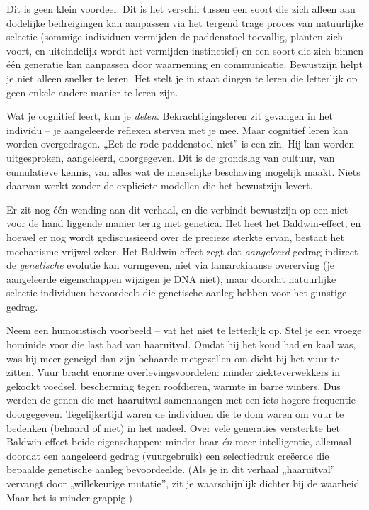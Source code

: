 \documentclass[11pt, twoside, openright]{book}
\begin{document}
Dit is geen klein voordeel. Dit is het verschil tussen een soort die zich alleen aan dodelijke bedreigingen kan aanpassen via het tergend trage proces van natuurlijke selectie (sommige individuen vermijden de paddenstoel toevallig, planten zich voort, en uiteindelijk wordt het vermijden instinctief) en een soort die zich binnen één generatie kan aanpassen door waarneming en communicatie. Bewustzijn helpt je niet alleen sneller te leren. Het stelt je in staat dingen te leren die letterlijk op geen enkele andere manier te leren zijn.

Wat je cognitief leert, kun je \textit{delen}. Bekrachtigingsleren zit gevangen in het individu -- je aangeleerde reflexen sterven met je mee. Maar cognitief leren kan worden overgedragen. „Eet de rode paddenstoel niet” is een zin. Hij kan worden uitgesproken, aangeleerd, doorgegeven. Dit is de grondslag van cultuur, van cumulatieve kennis, van alles wat de menselijke beschaving mogelijk maakt. Niets daarvan werkt zonder de expliciete modellen die het bewustzijn levert.

Er zit nog één wending aan dit verhaal, en die verbindt bewustzijn op een niet voor de hand liggende manier terug met genetica. Het heet het Baldwin-effect, en hoewel er nog wordt gediscussieerd over de precieze sterkte ervan, bestaat het mechanisme vrijwel zeker. Het Baldwin-effect zegt dat \textit{aangeleerd} gedrag indirect de \textit{genetische} evolutie kan vormgeven, niet via lamarckiaanse overerving (je aangeleerde eigenschappen wijzigen je DNA niet), maar doordat natuurlijke selectie individuen bevoordeelt die genetische aanleg hebben voor het gunstige gedrag.

Neem een humoristisch voorbeeld -- vat het niet te letterlijk op. Stel je een vroege hominide voor die last had van haaruitval. Omdat hij het koud had en kaal was, was hij meer geneigd dan zijn behaarde metgezellen om dicht bij het vuur te zitten. Vuur bracht enorme overlevingsvoordelen: minder ziekteverwekkers in gekookt voedsel, bescherming tegen roofdieren, warmte in barre winters. Dus werden de genen die met haaruitval samenhangen met een iets hogere frequentie doorgegeven. Tegelijkertijd waren de individuen die te dom waren om vuur te bedenken (behaard of niet) in het nadeel. Over vele generaties versterkte het Baldwin-effect beide eigenschappen: minder haar \textit{én} meer intelligentie, allemaal doordat een aangeleerd gedrag (vuurgebruik) een selectiedruk creëerde die bepaalde genetische aanleg bevoordeelde. (Als je in dit verhaal „haaruitval” vervangt door „willekeurige mutatie”, zit je waarschijnlijk dichter bij de waarheid. Maar het is minder grappig.)
\end{document}
